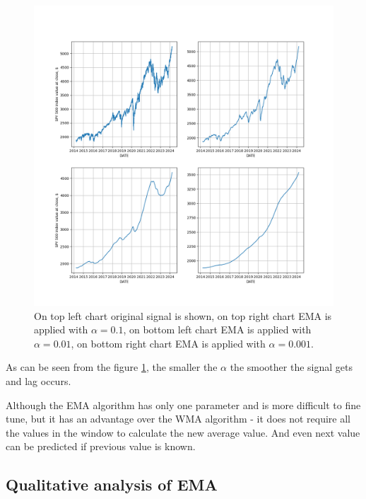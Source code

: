 \documentclass[a4paper,12pt,fleqn]{article}
\begin{document}
                \begin{figure}[ht]
                    \centering
                    \includegraphics[width=1\textwidth]{images/EMA_ex_1.png} %
                    \caption{On top left chart original signal is shown, on top right chart EMA is applied with $\alpha = 0.1$, on bottom left chart EMA is applied with $\alpha = 0.01$, on bottom right chart EMA is applied with $\alpha = 0.001$.}
                    \label{fig:EMA_ex_1}

                \end{figure}

                As can be seen from the figure \ref{fig:EMA_ex_1}, the smaller the \begin{math}
                    \alpha
                \end{math} the smoother the signal gets and lag occurs.

                Although the EMA algorithm has only one parameter and is more difficult to fine tune, but it has an 
                advantage over the WMA algorithm - it does not require all the values in the window to calculate the new average value. And 
                even next value can be predicted if previous value is known.
                \newpage
                \subsection{Qualitative analysis of EMA}
\end{document}
